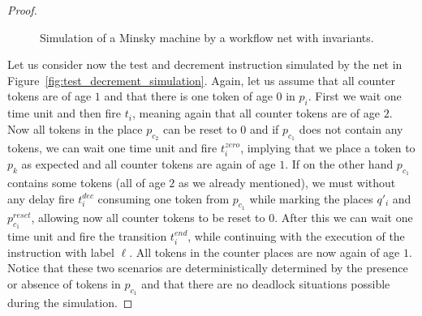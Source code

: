 \begin{proof}
\begin{figure}[h]
{
}
\caption{Simulation of a Minsky machine by a workflow net with invariants.\label{fig:cont}}
\end{figure}

Let us consider now the test and decrement instruction simulated by
the net in Figure~\ref{fig:test_decrement_simulation}. Again, let us assume
that all counter tokens are of age $1$ and that there is one token
of age $0$ in $p_i$. First we wait one time unit and then fire $t_i$,
meaning again that all counter tokens are of age $2$. Now all
tokens in the place $p_{c_2}$ can be reset to $0$ and if $p_{c_1}$
does not contain any tokens, we can wait one time unit and fire
$t_i^{\mathit zero}$, implying that we place a token to $p_k$
as expected and all counter tokens are again of age $1$.
If on the other hand $p_{c_1}$ contains some tokens (all of age $2$
as we already mentioned), we must without any delay fire
$t_i^{\mathit dec}$ consuming one token from $p_{c_1}$ while marking
the places $q'_i$ and $p^{\mathit reset}_{c_1}$, allowing
now all counter tokens to be reset to $0$. After this we can wait
one time unit and fire the transition $t_i^{\mathit end}$, while
continuing with the execution of the instruction with label $\ell$.
All tokens in the counter places are now again of age $1$.
Notice that these two scenarios are deterministically determined
by the presence or absence of tokens in $p_{c_1}$ and that there are
no deadlock situations possible during the simulation.


\end{proof}
